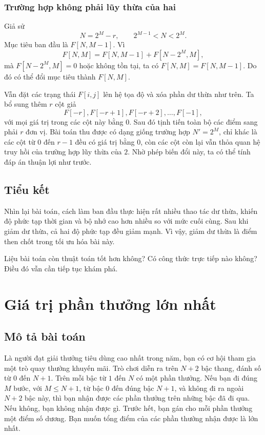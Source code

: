 \documentclass[11pt]{article}
\begin{document}
\subsubsection{Trường hợp không phải lũy thừa của hai}

Giả sử
\[
  N=2^M-r,\qquad 2^{M-1}<N<2^M.
\]
Mục tiêu ban đầu là $F[N,M-1]$. Vì
\[
  F[N,M]=F[N,M-1]+F[N-2^M,M],
\]
mà $F[N-2^M,M]=0$ hoặc không tồn tại, ta có $F[N,M]=F[N,M-1]$. Do đó có thể
đổi mục tiêu thành $F[N,M]$.

Vẫn đặt các trạng thái $F[i,j]$ lên hệ tọa độ và xóa phần dư thừa như trên.
Ta bổ sung thêm $r$ cột giả
\[
  F[-r],F[-r+1],F[-r+2],\ldots,F[-1],
\]
với mọi giá trị trong các cột này bằng $0$. Sau đó tịnh tiến toàn bộ các điểm
sang phải $r$ đơn vị. Bài toán thu được có dạng giống trường hợp
$N'=2^M$, chỉ khác là các cột từ $0$ đến $r-1$ đều có giá trị bằng $0$, còn
các cột còn lại vẫn thỏa quan hệ truy hồi của trường hợp lũy thừa của $2$.
Nhờ phép biến đổi này, ta có thể tính đáp án thuận lợi như trước.

\subsection{Tiểu kết}

Nhìn lại bài toán, cách làm ban đầu thực hiện rất nhiều thao tác dư thừa,
khiến độ phức tạp thời gian và bộ nhớ cao hơn nhiều so với mức cuối cùng.
Sau khi giảm dư thừa, cả hai độ phức tạp đều giảm mạnh. Vì vậy, giảm dư thừa
là điểm then chốt trong tối ưu hóa bài này.

Liệu bài toán còn thuật toán tốt hơn không? Có công thức trực tiếp nào không?
Điều đó vẫn cần tiếp tục khám phá.

\section{Giá trị phần thưởng lớn nhất}

\subsection{Mô tả bài toán}

Là người đạt giải thưởng tiêu dùng cao nhất trong năm, bạn có cơ hội tham gia
một trò quay thưởng khuyến mãi. Trò chơi diễn ra trên $N+2$ bậc thang, đánh
số từ $0$ đến $N+1$. Trên mỗi bậc từ $1$ đến $N$ có một phần thưởng. Nếu bạn
đi đúng $M$ bước, với $M\le N+1$, từ bậc $0$ đến đúng bậc $N+1$, và không đi
ra ngoài $N+2$ bậc này, thì bạn nhận được các phần thưởng trên những bậc đã
đi qua. Nếu không, bạn không nhận được gì. Trước hết, bạn gán cho mỗi phần
thưởng một điểm số dương. Bạn muốn tổng điểm của các phần thưởng nhận được là
lớn nhất.
\end{document}
